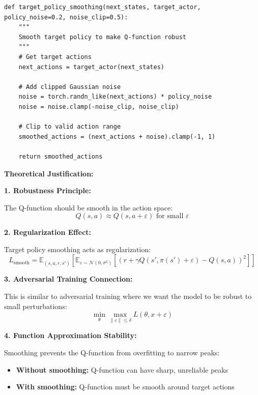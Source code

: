 \documentclass[12pt]{article}
\begin{document}
{{\begin{verbatim}
def target_policy_smoothing(next_states, target_actor, policy_noise=0.2, noise_clip=0.5):
    """
    Smooth target policy to make Q-function robust
    """
    # Get target actions
    next_actions = target_actor(next_states)
    
    # Add clipped Gaussian noise
    noise = torch.randn_like(next_actions) * policy_noise
    noise = noise.clamp(-noise_clip, noise_clip)
    
    # Clip to valid action range
    smoothed_actions = (next_actions + noise).clamp(-1, 1)
    
    return smoothed_actions
\end{verbatim}

\textbf{Theoretical Justification:}

\textbf{1. Robustness Principle:}

The Q-function should be smooth in the action space:
\begin{equation}
Q(s, a) \approx Q(s, a + \varepsilon) \text{ for small } \varepsilon
\end{equation}

\textbf{2. Regularization Effect:}

Target policy smoothing acts as regularization:
\begin{equation}
L_{\text{smooth}} = \mathbb{E}_{(s,a,r,s')} \left[ \mathbb{E}_{\varepsilon \sim \mathcal{N}(0, \sigma^2)} \left[ (r + \gamma Q(s', \pi(s') + \varepsilon) - Q(s,a))^2 \right] \right]
\end{equation}

\textbf{3. Adversarial Training Connection:}

This is similar to adversarial training where we want the model to be robust to small perturbations:
\begin{equation}
\min_\theta \max_{\|\varepsilon\| \leq \delta} L(\theta, x + \varepsilon)
\end{equation}

\textbf{4. Function Approximation Stability:}

Smoothing prevents the Q-function from overfitting to narrow peaks:
\begin{itemize}
\item \textbf{Without smoothing:} Q-function can have sharp, unreliable peaks
\item \textbf{With smoothing:} Q-function must be smooth around target actions
\end{itemize}

}}
\end{document}
